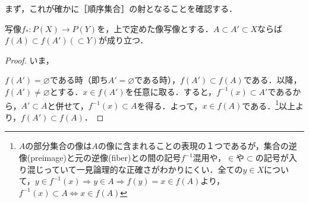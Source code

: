 \documentclass[uplatex, dvipdfmx]{jsreport}
\begin{document}
まず，これが確かに［順序集合］の射となることを確認する．
\begin{proposition}
    写像$f_*:P(X)\to P(Y)$を，上で定めた像写像とする．$A\subset A'\subset X$ならば$f(A)\subset f(A') (\subset Y)$が成り立つ．
\end{proposition}
\begin{proof}
    いま，
    \begin{center}\end{center}
    $f(A')=\varnothing$である時（即ち$A'=\varnothing$である時），$f(A')\subset f(A)$である．以降，$f(A')\ne\varnothing$とする．$x\in f(A')$を任意に取る．すると，$f^{-1}(x)\subset A'$であるから，$A'\subset A$と併せて，$f^{-1}(x)\subset A$を得る．よって，$x\in f(A)$である．\footnote{$A$の部分集合の像は$A$の像に含まれることの表現の１つであるが，集合の逆像(preimage)と元の逆像(fiber)との間の記号$f^{-1}$混用や，$\in$や$\subset$の記号が入り混じっていて一見論理的な正確さがわかりにくい．全ての$y\in X$について，$y\in f^{-1}(x)\Longrightarrow y\in A\Longrightarrow f(y)=x\in f(A)$より，$f^{-1}(x)\subset A\Longleftrightarrow x\in f(A)$}以上より，$f(A')\subset f(A)$．
\end{proof}
\end{document}
